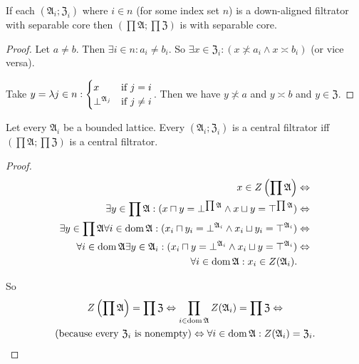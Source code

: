 \begin{prop}
If each $(\mathfrak{A}_{i};\mathfrak{Z}_{i})$ where $i\in n$ (for
some index set $n$) is a down-aligned filtrator with separable core
then $\left(\prod\mathfrak{A};\prod\mathfrak{Z}\right)$ is with separable
core.\end{prop}
\begin{proof}
Let $a\neq b$. Then $\exists i\in n:a_{i}\neq b_{i}$. So $\exists x\in\mathfrak{Z}_{i}:(x\nasymp a_{i}\wedge x\asymp b_{i})$
(or vice versa).

Take $y=
\lambda j\in n:\begin{cases}
x &\text{if }j=i\\
\bot^{\mathfrak{A}_j} &\text{if }j\ne i
\end{cases}$. Then we have
$y\nasymp a$ and $y\asymp b$ and $y\in\mathfrak{Z}$.\end{proof}
\begin{prop}
Let every $\mathfrak{A}_{i}$ be a bounded lattice. Every $(\mathfrak{A}_{i};\mathfrak{Z}_{i})$
is a central filtrator iff $\left(\prod\mathfrak{A};\prod\mathfrak{Z}\right)$
is a central filtrator.\end{prop}
\begin{proof}
~
\begin{align*}
x\in Z\left(\prod\mathfrak{A}\right) & \Leftrightarrow\\
\exists y\in\prod\mathfrak{A}:(x\sqcap y=\bot^{\prod\mathfrak{A}}\land x\sqcup y=\top^{\prod\mathfrak{A}}) & \Leftrightarrow\\
\exists y\in\prod\mathfrak{A}\forall i\in\operatorname{dom}\mathfrak{A}:(x_{i}\sqcap y_{i}=\bot^{\mathfrak{A}_{i}}\land x_{i}\sqcup y_{i}=\top^{\mathfrak{A}_{i}}) & \Leftrightarrow\\
\forall i\in\operatorname{dom}\mathfrak{A}\exists y\in\mathfrak{A}_{i}:(x_{i}\sqcap y=\bot^{\mathfrak{A}_{i}}\land x_{i}\sqcup y=\top^{\mathfrak{A}_{i}}) & \Leftrightarrow\\
\forall i\in\operatorname{dom}\mathfrak{A}:x_{i}\in Z(\mathfrak{A}_{i}).
\end{align*}


So 
\begin{multline*}
Z\left(\prod\mathfrak{A}\right)=\prod\mathfrak{Z}\Leftrightarrow\prod_{i\in\operatorname{dom}\mathfrak{A}}Z(\mathfrak{A}_{i})=\prod\mathfrak{Z}\Leftrightarrow\\
\text{(because every \ensuremath{\mathfrak{Z}_{i}} is nonempty)}\Leftrightarrow\forall i\in\operatorname{dom}\mathfrak{A}:Z(\mathfrak{A}_{i})=\mathfrak{Z}_{i}.
\end{multline*}
\end{proof}
